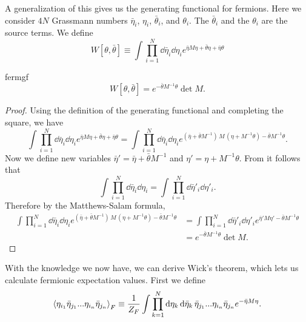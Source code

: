 A generalization of this gives us the generating functional
for fermions. Here we consider $4N$ Grassmann numbers $\bar{\eta}_i$,
$\eta_i$, $\bar{\theta}_i$, and $\theta_i$. The $\bar{\theta}_i$
and the $\theta_i$ are the source terms. We define
\begin{equation}\label{eq:deffermgf}
  W[\theta,\bar{\theta}]\equiv\int \prod_{i=1}^N\dd{\bar{\eta}_i}\dd{\eta_i}
   e^{\bar{\eta}M\eta+\bar{\theta}\eta+\bar{\eta}\theta}
\end{equation}
\begin{theorem}{}{fermgf}
$$
   W[\theta,\bar{\theta}]=e^{-\bar{\theta}M^{-1}\theta}\det M.
$$
\begin{proof} Using the definition of the generating functional and
completing the square, we have 
$$
  \int \prod_{i=1}^N\dd{\bar{\eta}_i}\dd{\eta_i}
   e^{\bar{\eta}M\eta+\bar{\theta}\eta+\bar{\eta}\theta}
   =\int \prod_{i=1}^N\dd{\bar{\eta}_i}\dd{\eta_i}
   e^{(\bar{\eta}+\bar{\theta}M^{-1})\,M\,
             (\eta+M^{-1}\theta)-\bar{\theta}M^{-1}\theta}.
$$
Now we define new variables $\bar{\eta}'=\bar{\eta}+\bar{\theta}M^{-1}$
and $\eta'=\eta+M^{-1}\theta$. From  it follows
that
$$
  \int \prod_{i=1}^N\dd{\bar{\eta}_i}\dd{\eta_i}=
  \int \prod_{i=1}^N\dd{\bar{\eta}'_i}\dd{\eta'_i}.
$$
Therefore by the Matthews-Salam formula,
\begin{equation*}\begin{aligned}
   \int \prod_{i=1}^N\dd{\bar{\eta}_i}\dd{\eta_i}
   e^{(\bar{\eta}+\bar{\theta}M^{-1})\,M\,
             (\eta+M^{-1}\theta)-\bar{\theta}M^{-1}\theta}
   &=\int \prod_{i=1}^N\dd{\bar{\eta}'_i}\dd{\eta'_i}
    e^{\bar{\eta}'M\eta'-\bar{\theta}M^{-1}\theta}\\
   &=e^{-\bar{\theta}M^{-1}\theta}\det M.
\end{aligned}\end{equation*}
\end{proof}
\end{theorem}
With the knowledge we now have, we can derive Wick's theorem, which lets us
calculate fermionic expectation values. First we define 
\begin{equation}\label{eq:deffermev}
  \ev{\eta_{i_1}\bar{\eta}_{j_1}...\eta_{i_n}\bar{\eta}_{j_n}}_F
  \equiv\frac{1}{Z_F}\int\prod_{k=1}^N\dd{\eta_k}\dd{\bar{\eta}_k}
        \bar{\eta}_{j_1}...\eta_{i_n}\bar{\eta}_{j_n}
        e^{-\bar{\eta}M\eta}.
\end{equation}
